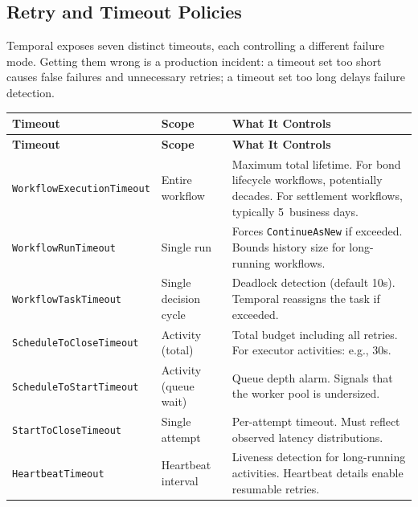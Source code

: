 \documentclass[11pt,a4paper]{article}
\begin{document}
\subsection{Retry and Timeout Policies}
\label{sec:temporal-timeouts}

Temporal exposes seven distinct timeouts, each controlling a different failure mode. Getting them wrong is a production incident: a timeout set too short causes false failures and unnecessary retries; a timeout set too long delays failure detection.

\begin{center}
\small
\begin{longtable}{p{4cm} p{2.8cm} p{6.5cm}}
\toprule
\textbf{Timeout} & \textbf{Scope} & \textbf{What It Controls} \\
\midrule
\endfirsthead
\toprule
\textbf{Timeout} & \textbf{Scope} & \textbf{What It Controls} \\
\midrule
\endhead
\texttt{WorkflowExecutionTimeout} &
  Entire workflow &
  Maximum total lifetime.
  For bond lifecycle workflows, potentially decades.
  For settlement workflows, typically 5~business days. \\
\midrule
\texttt{WorkflowRunTimeout} &
  Single run &
  Forces \texttt{ContinueAsNew} if exceeded.
  Bounds history size for long-running workflows. \\
\midrule
\texttt{WorkflowTaskTimeout} &
  Single decision cycle &
  Deadlock detection (default 10s).
  Temporal reassigns the task if exceeded. \\
\midrule
\texttt{ScheduleToCloseTimeout} &
  Activity (total) &
  Total budget including all retries.
  For executor activities: e.g., 30s. \\
\midrule
\texttt{ScheduleToStartTimeout} &
  Activity (queue wait) &
  Queue depth alarm.
  Signals that the worker pool is undersized. \\
\midrule
\texttt{StartToCloseTimeout} &
  Single attempt &
  Per-attempt timeout.
  Must reflect observed latency distributions. \\
\midrule
\texttt{HeartbeatTimeout} &
  Heartbeat interval &
  Liveness detection for long-running activities.
  Heartbeat details enable resumable retries. \\
\bottomrule
\end{longtable}
\end{center}
\end{document}

